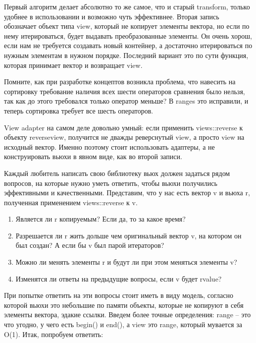 \documentclass[12pt, a4paper]{article}
\begin{document}
Первый алгоритм делает абсолютно то же самое, что и старый transform, только удобнее в использовании и возможно чуть эффективнее. Вторая запись обозначает объект типа view, который не копирует элементы вектора, но если по нему итерироваться, будет выдавать преобразованные элементы. Он очень хорош, если нам не требуется создавать новый контейнер, а достаточно итерироваться по нужным элементам в нужном порядке. Последний вариант это по сути функция, которая принимает вектор и возвращает view.
\par Помните, как при разработке концептов возникла проблема, что навесить на сортировку требование наличия всех шести операторов сравнения было нельзя, так как до этого требовался только оператор меньше? В ranges это исправили, и теперь сортировка требует все шесть операторов.
\par View adapter на самом деле довольно умный: если применить views::reverse к объекту reverse\textunderscore view, получится не дважды реверснутый view, а просто view на исходный вектор. Именно поэтому стоит использовать адаптеры, а не конструировать вьюхи в явном виде, как во второй записи.\\
\par Каждый любитель написать свою библиотеку вьюх должен задаться рядом вопросов, на которые нужно уметь ответить, чтобы вьюхи получились эффективными и качественными. Представим, что у нас есть вектор v и вьюха r, полученная применением views::reverse к v. 
\begin{enumerate}
	\item Является ли r копируемым? Если да, то за какое время?
	\item Разрешается ли r жить дольше чем оригинальный вектор v, на котором он был создан? А если бы v был парой итераторов?
	\item Можно ли менять элементы r и будут ли при этом меняться элементы v?
	\item Изменятся ли ответы на предыдущие вопросы, если v будет rvalue?
\end{enumerate}
При попытке ответить на эти вопросы стоит иметь в виду модель, согласно которой вьюхи это небольшие по памяти объекты, которые не копируют в себя элементы вектора, эдакие ссылки. Введем более точные определения: range -- это что угодно, у чего есть begin() и end(), а view это range, который мувается за O(1). Итак, попробуем ответить:
\end{document}
